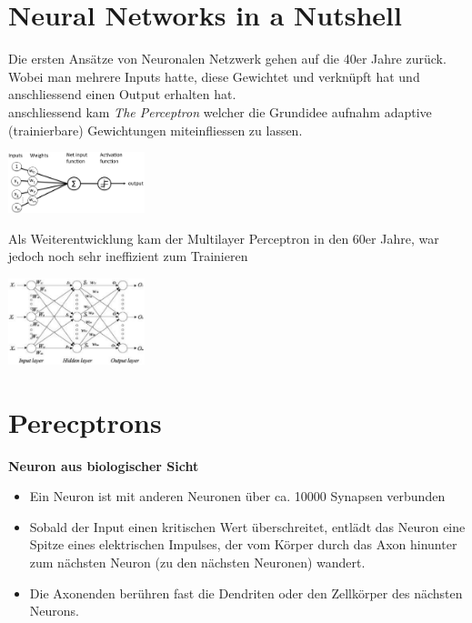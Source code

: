 \documentclass{article}
\newenvironment{Figure}
	{\par\medskip\noindent\minipage{\linewidth}}
	{\endminipage\par\medskip}
\theoremstyle{merke}
\theoremstyle{definition}
\begin{document}
    \section{Neural Networks in a Nutshell}
    Die ersten Ansätze von Neuronalen Netzwerk gehen auf die 40er Jahre zurück. Wobei man mehrere Inputs hatte, diese Gewichtet und verknüpft hat und anschliessend einen Output erhalten hat.\\
    anschliessend kam \textit{The Perceptron} welcher die Grundidee aufnahm adaptive (trainierbare) Gewichtungen miteinfliessen zu lassen.
    \begin{Figure}
    \centering
    \includegraphics[width=150px]{img/ThePerceptron.png}
        \label{fig:Abbildung vom Perceptron}
    \end{Figure}
    Als Weiterentwicklung kam der Multilayer Perceptron in den 60er Jahre, war jedoch noch sehr ineffizient zum Trainieren
    \begin{Figure}
    \centering
    \includegraphics[width=150px]{img/MLP.png}
        \label{fig:Abbildung vom Multi-Layer Perceptron}
    \end{Figure}

    \section{Perecptrons}
    \textbf{Neuron aus biologischer Sicht}
    \begin{itemize}
	    \item Ein Neuron ist mit anderen Neuronen über ca. 10000 Synapsen verbunden
	    \item Sobald der Input einen kritischen Wert überschreitet, entlädt das Neuron eine Spitze eines elektrischen Impulses, der vom Körper durch das Axon hinunter zum nächsten Neuron (zu den nächsten Neuronen) wandert.
	    \item Die Axonenden berühren fast die Dendriten oder den Zellkörper des nächsten Neurons.
    \end{itemize}
\end{document}
